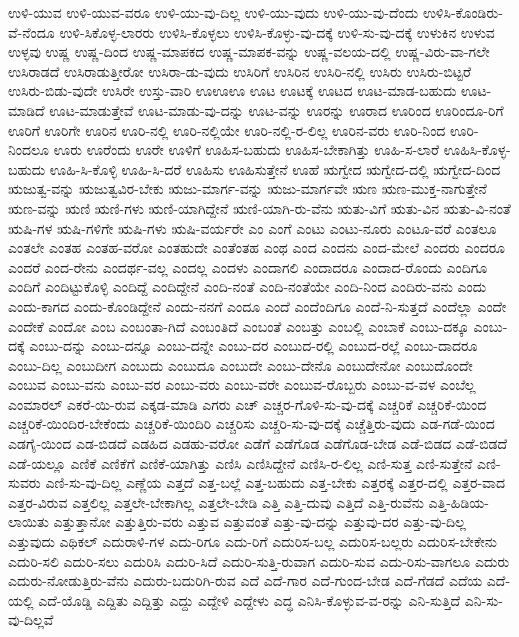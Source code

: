 {ಉಳಿ-ಯುವ
ಉಳಿ-ಯುವ-ವರೂ
ಉಳಿ-ಯು-ವು-ದಿಲ್ಲ
ಉಳಿ-ಯು-ವುದು
ಉಳಿ-ಯು-ವು-ದೆಂದು
ಉಳಿಸಿ-ಕೊಂಡಿರು-ವೆ-ನೆಂದೂ
ಉಳಿ-ಸಿಕೊಳ್ಳ-ಲಾರರು
ಉಳಿಸಿ-ಕೊಳ್ಳಲು
ಉಳಿಸಿ-ಕೊಳ್ಳು-ವು-ದಕ್ಕೆ
ಉಳಿ-ಸು-ವು-ದಕ್ಕೆ
ಉಳುಕಿನ
ಉಳುವ
ಉಳ್ಳವು
ಉಷ್ಣ
ಉಷ್ಣ-ದಿಂದ
ಉಷ್ಣ-ಮಾಪಕದ
ಉಷ್ಣ-ಮಾಪಕ-ವನ್ನು
ಉಷ್ಣ-ವಲಯ-ದಲ್ಲಿ
ಉಷ್ಣ-ವಿರು-ವಾ-ಗಲೇ
ಉಸಿರಾಡದೆ
ಉಸಿರಾಡುತ್ತೀರೋ
ಉಸಿರಾ-ಡು-ವುದು
ಉಸಿರಿಗೆ
ಉಸಿರಿನ
ಉಸಿರಿ-ನಲ್ಲಿ
ಉಸಿರು
ಉಸಿರು-ಬಿಟ್ಟರೆ
ಉಸಿರು-ಬಿಡು-ವುದೇ
ಉಸಿರೇ
ಉಸ್ತು-ವಾರಿ
ಊಊಊ
ಊಟ
ಊಟಕ್ಕೆ
ಊಟದ
ಊಟ-ಮಾಡ-ಬಹುದು
ಊಟ-ಮಾಡಿದೆ
ಊಟ-ಮಾಡುತ್ತೇವೆ
ಊಟ-ಮಾಡು-ವು-ದನ್ನು
ಊಟ-ವನ್ನು
ಊರನ್ನು
ಊರಾದ
ಊರಿಂದ
ಊರಿಂದೂ-ರಿಗೆ
ಊರಿಗೆ
ಊರಿಗೇ
ಊರಿನ
ಊರಿ-ನಲ್ಲಿ
ಊರಿ-ನಲ್ಲಿಯೇ
ಊರಿ-ನಲ್ಲಿ-ರ-ಲಿಲ್ಲ
ಊರಿನ-ವರು
ಊರಿ-ನಿಂದ
ಊರಿ-ನಿಂದಲೂ
ಊರು
ಊರೆಂದು
ಊರೇ
ಊಳಿಗೆ
ಊಹಿಸ-ಬಹುದು
ಊಹಿಸ-ಬೇಕಾಗಿತ್ತು
ಊಹಿ-ಸ-ಲಾರೆ
ಊಹಿಸಿ-ಕೊಳ್ಳ-ಬಹುದು
ಊಹಿ-ಸಿ-ಕೊಳ್ಳಿ
ಊಹಿ-ಸಿ-ದರೆ
ಊಹಿಸು
ಊಹಿಸುತ್ತೇನೆ
ಊಹೆ
ಋಗ್ವೇದ
ಋಗ್ವೇದ-ದಲ್ಲಿ
ಋಗ್ವೇದ-ದಿಂದ
ಋಜುತ್ವ-ವನ್ನು
ಋಜುತ್ವವಿರ-ಬೇಕು
ಋಜು-ಮಾರ್ಗ-ವನ್ನು
ಋಜು-ಮಾರ್ಗವೇ
ಋಣ
ಋಣ-ಮುಕ್ತ-ನಾಗುತ್ತೇನೆ
ಋಣ-ವನ್ನು
ಋಣಿ
ಋಣಿ-ಗಳು
ಋಣಿ-ಯಾಗಿದ್ದೇನೆ
ಋಣಿ-ಯಾಗಿ-ರು-ವೆನು
ಋತು-ವಿಗೆ
ಋತು-ವಿನ
ಋತು-ವಿ-ನಂತೆ
ಋಷಿ-ಗಳ
ಋಷಿ-ಗಳಿಗೇ
ಋಷಿ-ಗಳು
ಋಷಿ-ವರ್ಯರೇ
ಎಂ
ಎಂಗೆ
ಎಂಟು
ಎಂಟು-ನೂರು
ಎಂಟೂ-ವರೆ
ಎಂತಲೂ
ಎಂತಲೇ
ಎಂತಹ
ಎಂತಹ-ವರೋ
ಎಂತಹುದೇ
ಎಂತೆಂತಹ
ಎಂಥ
ಎಂದ
ಎಂದನು
ಎಂದ-ಮೇಲೆ
ಎಂದರು
ಎಂದರೂ
ಎಂದರೆ
ಎಂದ-ರೇನು
ಎಂದರ್ಥ-ವಲ್ಲ
ಎಂದಲ್ಲ
ಎಂದಳು
ಎಂದಾಗಲಿ
ಎಂದಾದರೂ
ಎಂದಾದ-ರೊಂದು
ಎಂದಿಗೂ
ಎಂದಿಗೆ
ಎಂದಿಟ್ಟುಕೊಳ್ಳಿ
ಎಂದಿದ್ದೆ
ಎಂದಿದ್ದೇನೆ
ಎಂದಿ-ನಂತೆ
ಎಂದಿ-ನಂತೆಯೇ
ಎಂದಿ-ನಿಂದ
ಎಂದಿರು-ವನು
ಎಂದು
ಎಂದು-ಕಾಗದ
ಎಂದು-ಕೊಂಡಿದ್ದೇನೆ
ಎಂದು-ನನಗೆ
ಎಂದೂ
ಎಂದೆ
ಎಂದೆಂದಿಗೂ
ಎಂದೆ-ನಿ-ಸುತ್ತದೆ
ಎಂದೆಲ್ಲಾ
ಎಂದೇ
ಎಂದೇಕೆ
ಎಂದೋ
ಎಂಬ
ಎಂಬಂತಾ-ಗಿದೆ
ಎಂಬಂತಿದೆ
ಎಂಬಂತೆ
ಎಂಬತ್ತು
ಎಂಬಲ್ಲಿ
ಎಂಬಾಕೆ
ಎಂಬು-ದಕ್ಕೂ
ಎಂಬು-ದಕ್ಕೆ
ಎಂಬು-ದನ್ನು
ಎಂಬು-ದನ್ನೂ
ಎಂಬು-ದನ್ನೇ
ಎಂಬು-ದರ
ಎಂಬುದ-ರಲ್ಲಿ
ಎಂಬುದ-ರಲ್ಲೆ
ಎಂಬು-ದಾದರೂ
ಎಂಬು-ದಿಲ್ಲ
ಎಂಬುದೀಗ
ಎಂಬುದು
ಎಂಬುದೂ
ಎಂಬುದೇ
ಎಂಬು-ದೇನೊ
ಎಂಬುದೇನೋ
ಎಂಬುದೊಂದೇ
ಎಂಬುವ
ಎಂಬು-ವನು
ಎಂಬು-ವರ
ಎಂಬು-ವರು
ಎಂಬು-ವರೇ
ಎಂಬುವ-ರೊಬ್ಬರು
ಎಂಬು-ವ-ವಳ
ಎಂಬೆಲ್ಲ
ಎಂಮಾರಲ್
ಎಕರೆ-ಯಿ-ರುವ
ಎಕ್ಕಡ-ಮಾಡಿ
ಎಗರು
ಎಚ್
ಎಚ್ಚರ-ಗೊಳಿ-ಸು-ವು-ದಕ್ಕೆ
ಎಚ್ಚರಿಕೆ
ಎಚ್ಚರಿಕೆ-ಯಿಂದ
ಎಚ್ಚರಿಕೆ-ಯಿಂದಿರ-ಬೇಕೆಂದು
ಎಚ್ಚರಿಕೆ-ಯಿಂದಿರಿ
ಎಚ್ಚರಿಸು
ಎಚ್ಚರಿ-ಸು-ವು-ದಕ್ಕೆ
ಎಚ್ಚೆತ್ತಿರು-ವುದು
ಎಡ-ಗಡೆ-ಯಿಂದ
ಎಡಗೈ-ಯಿಂದ
ಎಡ-ಬಿಡದೆ
ಎಡಹಿದ
ಎಡಹು-ವರೋ
ಎಡೆಗೆ
ಎಡೆಗೊಡ
ಎಡೆಗೊಡ-ಬೇಡ
ಎಡೆ-ಬಿಡದ
ಎಡೆ-ಬಿಡದೆ
ಎಡೆ-ಯಲ್ಲೂ
ಎಣಿಕೆ
ಎಣಿಕೆಗೆ
ಎಣಿಕೆ-ಯಾಗಿತ್ತು
ಎಣಿಸಿ
ಎಣಿಸಿದ್ದೇನೆ
ಎಣಿಸಿ-ರ-ಲಿಲ್ಲ
ಎಣಿ-ಸುತ್ತ
ಎಣಿ-ಸುತ್ತೇನೆ
ಎಣಿ-ಸುವರು
ಎಣಿ-ಸು-ವು-ದಿಲ್ಲ
ಎಣ್ಣೆಯ
ಎತ್ತದೆ
ಎತ್ತ-ಬಲ್ಲೆ
ಎತ್ತ-ಬಹುದು
ಎತ್ತ-ಬೇಕು
ಎತ್ತರಕ್ಕೆ
ಎತ್ತರ-ದಲ್ಲಿ
ಎತ್ತರ-ವಾದ
ಎತ್ತರ-ವಿರುವ
ಎತ್ತಲಿಲ್ಲ
ಎತ್ತಲೇ-ಬೇಕಾಗಿಲ್ಲ
ಎತ್ತಲೇ-ಬೇಡಿ
ಎತ್ತಿ
ಎತ್ತಿ-ದುವು
ಎತ್ತಿದೆ
ಎತ್ತಿ-ರುವೆನು
ಎತ್ತಿ-ಹಿಡಿಯ-ಲಾಯಿತು
ಎತ್ತುತ್ತಾನೋ
ಎತ್ತುತ್ತಿರು-ವರು
ಎತ್ತುವ
ಎತ್ತುವಂತೆ
ಎತ್ತು-ವು-ದನ್ನು
ಎತ್ತುವು-ದರ
ಎತ್ತು-ವು-ದಿಲ್ಲ
ಎತ್ತುವುದು
ಎಥಿಕಲ್
ಎದುರಾಳಿ-ಗಳ
ಎದು-ರಿಗೂ
ಎದು-ರಿಗೆ
ಎದುರಿಸ-ಬಲ್ಲ
ಎದುರಿಸ-ಬಲ್ಲರು
ಎದುರಿಸ-ಬೇಕೇನು
ಎದುರಿ-ಸಲಿ
ಎದುರಿ-ಸಲು
ಎದುರಿಸಿ
ಎದುರಿ-ಸಿದೆ
ಎದುರಿ-ಸುತ್ತಿ-ರುವಾಗ
ಎದುರಿ-ಸುವ
ಎದು-ರಿಸು-ವಾಗಲೂ
ಎದುರು
ಎದುರು-ನೋಡುತ್ತಿರು-ವೆನು
ಎದುರು-ಬದುರಿಗಿ-ರುವ
ಎದೆ
ಎದೆ-ಗಾರ
ಎದೆ-ಗುಂದ-ಬೇಡ
ಎದೆ-ಗೆಡದೆ
ಎದೆಯ
ಎದೆ-ಯಲ್ಲಿ
ಎದೆ-ಯೊಡ್ಡಿ
ಎದ್ದಿತು
ಎದ್ದಿತ್ತು
ಎದ್ದು
ಎದ್ದೇಳಿ
ಎದ್ದೇಳು
ಎದ್ಧ
ಎನಿಸಿ-ಕೊಳ್ಳುವ-ವ-ರನ್ನು
ಎನಿ-ಸುತ್ತಿದೆ
ಎನಿ-ಸು-ವು-ದಿಲ್ಲವೆ
}
